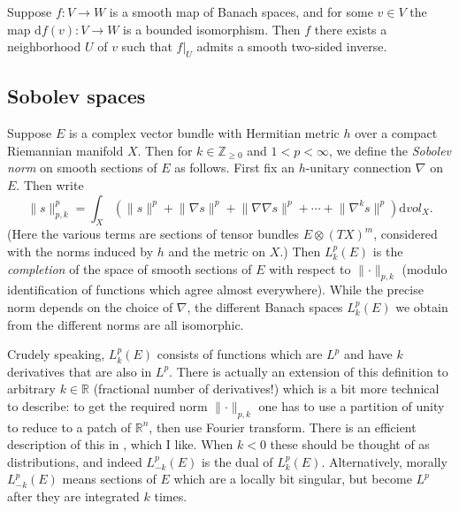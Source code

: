 \documentclass[12pt,letterpaper,reqno]{article}
\numberwithin{equation}{section}
\newcommand{\R}{\ensuremath{\mathbb R}}
\newcommand{\Z}{\ensuremath{\mathbb Z}}
\newcommand{\de}{\mathrm{d}}
\newcommand{\norm}[1]{\lVert#1\rVert}
\newcommand{\ti}[1]{\textit{#1}}
\begin{document}
\begin{thm}
Suppose $f: V \to W$ is a smooth map of Banach spaces, and for some
$v \in V$ the map $\de f(v): V \to W$ is a bounded isomorphism.
Then $f$ there exists a neighborhood $U$ of $v$ such that $f \vert_U$
admits a smooth two-sided inverse.
\end{thm}

\subsection{Sobolev spaces}

\begin{example} Suppose $E$ is a complex
vector bundle with Hermitian metric $h$
over a compact Riemannian manifold $X$. Then for $k \in \Z_{\ge 0}$ and 
$1 < p < \infty$, we define the \ti{Sobolev norm}
on smooth sections of $E$ as follows.
First fix an $h$-unitary connection $\nabla$ on $E$.
Then write
\begin{equation}
  \norm{s}^p_{p,k} = \int_X \left(\norm{s}^p + \norm{\nabla s}^p + \norm {\nabla \nabla s}^p +
    \cdots + \norm{\nabla^k s}^p\right) \de vol_X.
\end{equation}
(Here the various terms are sections of tensor bundles $E \otimes (TX)^m$,
considered with the norms induced by $h$ and the metric on $X$.)
Then $L^p_k(E)$ is the \ti{completion} of the space of smooth
sections of $E$ with respect to $\norm{\cdot}_{p,k}$ (modulo identification
of functions which agree almost everywhere).
While the precise norm depends on the choice of $\nabla$, the 
different Banach spaces $L^p_k(E)$ we obtain from the different
norms are all isomorphic.
\end{example}

Crudely speaking, $L^p_k(E)$ consists of functions which are $L^p$ and 
have $k$ derivatives that are also in $L^p$.
There is actually an extension of this definition to arbitrary $k \in \R$
(fractional number of derivatives!) which is a bit more technical to describe:
to get the required norm $\norm{\cdot}_{p,k}$ 
one has to use a partition of unity to reduce to a patch of $\R^n$,
then use Fourier transform. There is an efficient description of this in
\cite{MR2359489}, which I like. When $k<0$ these should be thought of
as distributions, and indeed $L^p_{-k}(E)$ is the dual of
$L^p_k(E)$.
Alternatively, morally $L^p_{-k}(E)$ means sections of $E$ 
which are a locally bit singular, but become $L^p$ after they 
are integrated $k$ times.
\end{document}
